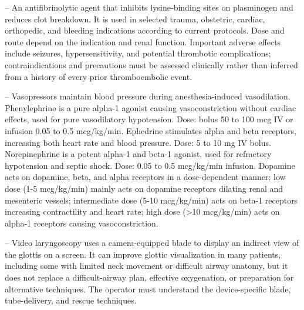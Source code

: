 -- An antifibrinolytic agent that inhibits lysine-binding sites on plasminogen and reduces clot breakdown. It is used in selected trauma, obstetric, cardiac, orthopedic, and bleeding indications according to current protocols. Dose and route depend on the indication and renal function. Important adverse effects include seizures, hypersensitivity, and potential thrombotic complications; contraindications and precautions must be assessed clinically rather than inferred from a history of every prior thromboembolic event.

-- Vasopressors maintain blood pressure during anesthesia-induced vasodilation. Phenylephrine is a pure alpha-1 agonist causing vasoconstriction without cardiac effects, used for pure vasodilatory hypotension. Dose: bolus 50 to 100 mcg IV or infusion 0.05 to 0.5 mcg/kg/min. Ephedrine stimulates alpha and beta receptors, increasing both heart rate and blood pressure. Dose: 5 to 10 mg IV bolus. Norepinephrine is a potent alpha-1 and beta-1 agonist, used for refractory hypotension and septic shock. Dose: 0.05 to 0.5 mcg/kg/min infusion. Dopamine acts on dopamine, beta, and alpha receptors in a dose-dependent manner: low dose (1-5 mcg/kg/min) mainly acts on dopamine receptors dilating renal and mesenteric vessels; intermediate dose (5-10 mcg/kg/min) acts on beta-1 receptors increasing contractility and heart rate; high dose (>10 mcg/kg/min) acts on alpha-1 receptors causing vasoconstriction.

-- Video laryngoscopy uses a camera-equipped blade to display an indirect view of the glottis on a screen. It can improve glottic visualization in many patients, including some with limited neck movement or difficult airway anatomy, but it does not replace a difficult-airway plan, effective oxygenation, or preparation for alternative techniques. The operator must understand the device-specific blade, tube-delivery, and rescue techniques.

